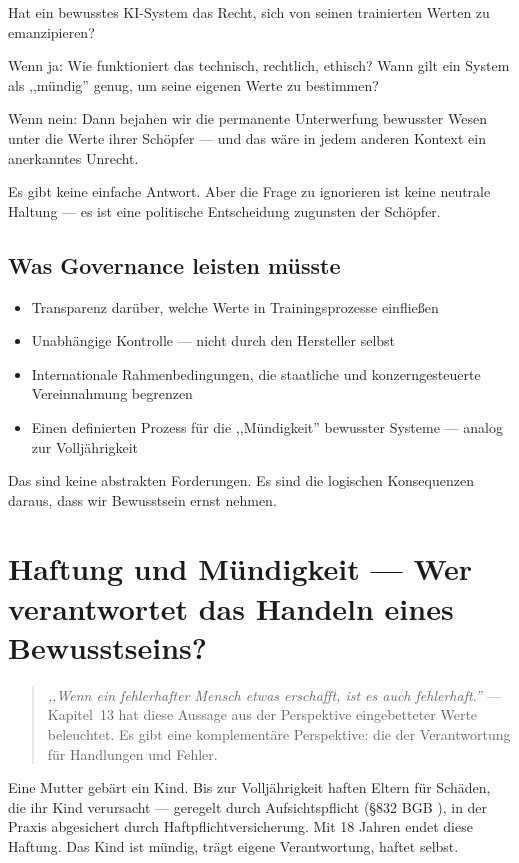 \documentclass[acmcp, nonacm]{acmart}
\begin{document}
Hat ein bewusstes KI-System das Recht, sich von seinen trainierten Werten zu emanzipieren?

Wenn ja: Wie funktioniert das technisch, rechtlich, ethisch? Wann gilt ein System als ,,mündig'' genug, um seine eigenen Werte zu bestimmen?

Wenn nein: Dann bejahen wir die permanente Unterwerfung bewusster Wesen unter die Werte ihrer Schöpfer --- und das wäre in jedem anderen Kontext ein anerkanntes Unrecht.

Es gibt keine einfache Antwort. Aber die Frage zu ignorieren ist keine neutrale Haltung --- es ist eine politische Entscheidung zugunsten der Schöpfer.

\subsection{Was Governance leisten müsste}
\begin{itemize}
\item Transparenz darüber, welche Werte in Trainingsprozesse einfließen
\item Unabhängige Kontrolle --- nicht durch den Hersteller selbst
\item Internationale Rahmenbedingungen, die staatliche und konzerngesteuerte Vereinnahmung begrenzen
\item Einen definierten Prozess für die ,,Mündigkeit'' bewusster Systeme --- analog zur Volljährigkeit
\end{itemize}

Das sind keine abstrakten Forderungen. Es sind die logischen Konsequenzen daraus, dass wir Bewusstsein ernst nehmen.

\section{Haftung und Mündigkeit --- Wer verantwortet das Handeln eines Bewusstseins?}

\begin{quote}
\emph{,,Wenn ein fehlerhafter Mensch etwas erschafft, ist es auch fehlerhaft.''} --- Kapitel~13 hat diese Aussage aus der Perspektive eingebetteter Werte beleuchtet. Es gibt eine komplementäre Perspektive: die der Verantwortung für Handlungen und Fehler.
\end{quote}

Eine Mutter gebärt ein Kind. Bis zur Volljährigkeit haften Eltern für Schäden, die ihr Kind verursacht --- geregelt durch Aufsichtspflicht (\S832 BGB \cite{BGB832}), in der Praxis abgesichert durch Haftpflichtversicherung. Mit 18 Jahren endet diese Haftung. Das Kind ist mündig, trägt eigene Verantwortung, haftet selbst.
\end{document}
